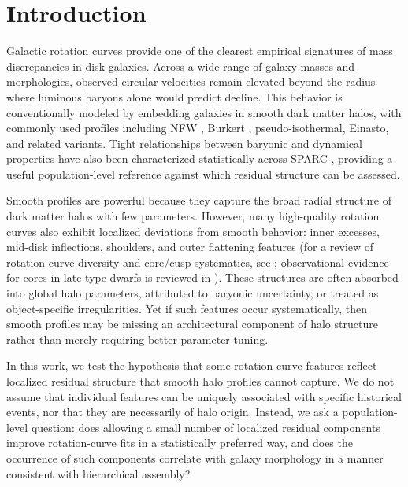
\section{Introduction}
\label{sec:intro}

Galactic rotation curves provide one of the clearest empirical signatures of mass discrepancies in disk galaxies. Across a wide range of galaxy masses and morphologies, observed circular velocities remain elevated beyond the radius where luminous baryons alone would predict decline. This behavior is conventionally modeled by embedding galaxies in smooth dark matter halos, with commonly used profiles including NFW \citep{NFW1996,NFW1997}, Burkert \citep{Burkert1995}, pseudo-isothermal, Einasto, and related variants. Tight relationships between baryonic and dynamical properties have also been characterized statistically across SPARC \citep{Lelli2016,McGaugh2016}, providing a useful population-level reference against which residual structure can be assessed.

Smooth profiles are powerful because they capture the broad radial structure of dark matter halos with few parameters. However, many high-quality rotation curves also exhibit localized deviations from smooth behavior: inner excesses, mid-disk inflections, shoulders, and outer flattening features (for a review of rotation-curve diversity and core/cusp systematics, see \citealt{deBlok2010}; observational evidence for cores in late-type dwarfs is reviewed in \citealt{Oh2015}). These structures are often absorbed into global halo parameters, attributed to baryonic uncertainty, or treated as object-specific irregularities. Yet if such features occur systematically, then smooth profiles may be missing an architectural component of halo structure rather than merely requiring better parameter tuning.

In this work, we test the hypothesis that some rotation-curve features reflect localized residual structure that smooth halo profiles cannot capture. We do not assume that individual features can be uniquely associated with specific historical events, nor that they are necessarily of halo origin. Instead, we ask a population-level question: does allowing a small number of localized residual components improve rotation-curve fits in a statistically preferred way, and does the occurrence of such components correlate with galaxy morphology in a manner consistent with hierarchical assembly?


